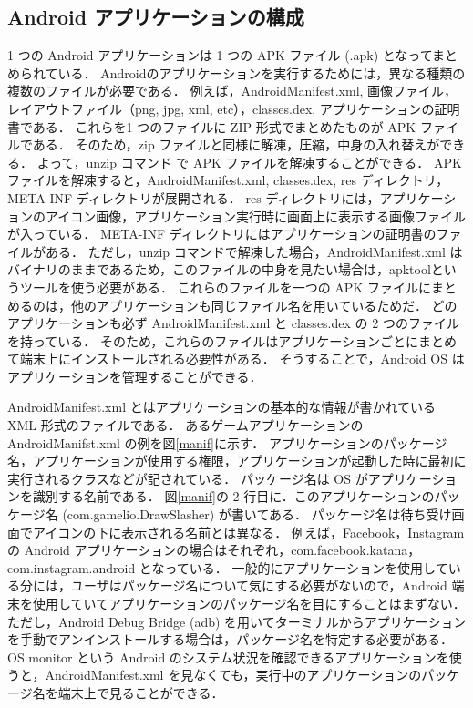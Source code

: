 \subsection{Android アプリケーションの構成}
\label{sec:andrapp}
1 つの Android アプリケーションは 1 つの APK ファイル (.apk) となってまとめられている．
Androidのアプリケーションを実行するためには，異なる種類の複数のファイルが必要である．
例えば，AndroidManifest.xml, 画像ファイル，レイアウトファイル（png, jpg, xml, etc），classes.dex, アプリケーションの証明書である．
これらを1 つのファイルに ZIP 形式でまとめたものが APK ファイルである．
そのため，zip ファイルと同様に解凍，圧縮，中身の入れ替えができる．
よって，unzip コマンド で APK ファイルを解凍することができる．
APK ファイルを解凍すると，AndroidManifest.xml, classes.dex, res ディレクトリ，META-INF ディレクトリが展開される．
res ディレクトリには，アプリケーションのアイコン画像，アプリケーション実行時に画面上に表示する画像ファイルが入っている．
META-INF ディレクトリにはアプリケーションの証明書のファイルがある．
ただし，unzip コマンドで解凍した場合，AndroidManifest.xml はバイナリのままであるため，このファイルの中身を見たい場合は，apktool\cite{apktool}というツールを使う必要がある．
これらのファイルを一つの APK ファイルにまとめるのは，他のアプリケーションも同じファイル名を用いているためだ．
どのアプリケーションも必ず AndroidManifest.xml と classes.dex の 2 つのファイルを持っている．
そのため，これらのファイルはアプリケーションごとにまとめて端末上にインストールされる必要性がある．
そうすることで，Android OS はアプリケーションを管理することができる．

AndroidManifest.xml とはアプリケーションの基本的な情報が書かれている XML 形式のファイルである．
あるゲームアプリケーションの AndroidManifst.xml の例を図\ref{manif}に示す．
アプリケーションのパッケージ名，アプリケーションが使用する権限，アプリケーションが起動した時に最初に実行されるクラスなどが記されている．
パッケージ名は OS がアプリケーションを識別する名前である．
図\ref{manif}の 2 行目に．このアプリケーションのパッケージ名 (com.gamelio.DrawSlasher) が書いてある．
パッケージ名は待ち受け画面でアイコンの下に表示される名前とは異なる．
例えば，Facebook，Instagram の Android アプリケーションの場合はそれぞれ，com.facebook.katana，com.instagram.android となっている．
一般的にアプリケーションを使用している分には，ユーザはパッケージ名について気にする必要がないので，Android 端末を使用していてアプリケーションのパッケージ名を目にすることはまずない．
ただし，Android Debug Bridge (adb) を用いてターミナルからアプリケーションを手動でアンインストールする場合は，パッケージ名を特定する必要がある．
OS monitor という Android のシステム状況を確認できるアプリケーションを使うと，AndroidManifest.xml を見なくても，実行中のアプリケーションのパッケージ名を端末上で見ることができる．


